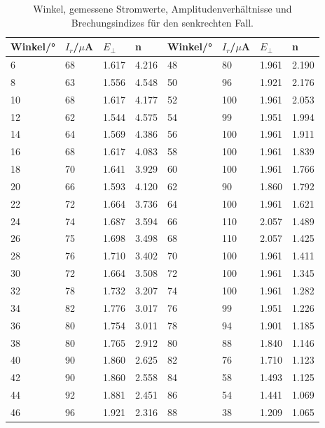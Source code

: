 \begin{table}[H]
  \centering
  \caption{Winkel, gemessene Stromwerte, Amplitudenverhältnisse und Brechungsindizes für den senkrechten Fall.}
  \begin{tabular}{l|l|l|l|l|l|l|l}
  Winkel/° & $I_r$/$\mu$A & $E_\bot$ & n & Winkel/° & $I_r$/$\mu$A & $E_\bot$ & n\\\hline
  6 & 68 & 1.617 & 4.216 & 48 & 80 & 1.961 & 2.190\\
  8 & 63 & 1.556 & 4.548 & 50 & 96 & 1.921 & 2.176\\
  10 & 68 & 1.617 & 4.177 & 52 & 100 & 1.961 & 2.053\\
  12 & 62 & 1.544 & 4.575 & 54 & 99 & 1.951 & 1.994\\
  14 & 64 & 1.569 & 4.386 & 56 & 100 & 1.961 & 1.911\\
  16 & 68 & 1.617 & 4.083 & 58 & 100 & 1.961 & 1.839\\
  18 & 70 & 1.641 & 3.929 & 60 & 100 & 1.961 & 1.766\\
  20 & 66 & 1.593 & 4.120 & 62 & 90 & 1.860 & 1.792\\
  22 & 72 & 1.664 & 3.736 & 64 & 100 & 1.961 & 1.621\\
  24 & 74 & 1.687 & 3.594 & 66 & 110 & 2.057 & 1.489\\
  26 & 75 & 1.698 & 3.498 & 68 & 110 & 2.057 & 1.425\\
  28 & 76 & 1.710 & 3.402 & 70 & 100 & 1.961 & 1.411\\
  30 & 72 & 1.664 & 3.508 & 72 & 100 & 1.961 & 1.345\\
  32 & 78 & 1.732 & 3.207 & 74 & 100 & 1.961 & 1.282\\
  34 & 82 & 1.776 & 3.017 & 76 & 99 & 1.951 & 1.226\\
  36 & 80 & 1.754 & 3.011 & 78 & 94 & 1.901 & 1.185\\
  38 & 80 & 1.765 & 2.912 & 80 & 88 & 1.840 & 1.146\\
  40 & 90 & 1.860 & 2.625 & 82 & 76 & 1.710 & 1.123\\
  42 & 90 & 1.860 & 2.558 & 84 & 58 & 1.493 & 1.125\\
  44 & 92 & 1.881 & 2.451 & 86 & 54 & 1.441 & 1.069\\
  46 & 96 & 1.921 & 2.316 & 88 & 38 & 1.209 & 1.065\\\hline
  \end{tabular}
  \label{i1}
\end{table}

